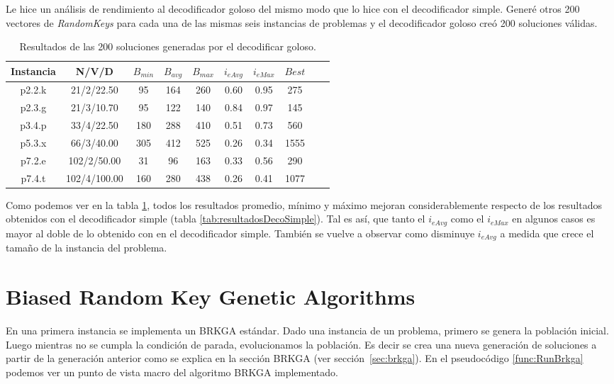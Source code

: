 \bigskip

Le hice un análisis de rendimiento al decodificador goloso del mismo modo que lo hice con el decodificador simple. Generé otros 200 vectores de \textit{RandomKeys} para cada una de las mismas seis instancias de problemas y el decodificador goloso creó 200 soluciones válidas.

\begin{table}
\begin{center}
\begin{tabular}{ |c|c|c|c|c|c|c|c|c|c| } 
\hline
Instancia & N/V/D & $B_{min}$ & $B_{avg}$ & $B_{max}$ & $i_{eAvg}$ & $i_{eMax}$ & $Best$ \\
\hline
p2.2.k & 21/2/22.50 & 95 & 164 & 260 & 0.60 & 0.95 & 275 \\
p2.3.g & 21/3/10.70 & 95 & 122 & 140 & 0.84 & 0.97 & 145 \\
p3.4.p & 33/4/22.50 & 180 & 288 & 410 & 0.51 & 0.73 & 560 \\
p5.3.x & 66/3/40.00 & 305 & 412 & 525 & 0.26 & 0.34 & 1555 \\
p7.2.e & 102/2/50.00 & 31 & 96 & 163 & 0.33 & 0.56 & 290 \\
p7.4.t & 102/4/100.00 & 160 & 280 & 438 & 0.26 & 0.41 & 1077 \\
\hline
\end{tabular}
\end{center}
\caption{Resultados de las 200 soluciones generadas por el decodificar goloso.}
\label{tab:resultadosDecoGoloso}
\end{table}

\bigskip

Como podemos ver en la tabla \ref{tab:resultadosDecoGoloso}, todos los resultados promedio, mínimo y máximo mejoran considerablemente respecto de los resultados obtenidos con el decodificador simple (tabla \ref{tab:resultadosDecoSimple}). Tal es así, que tanto el $i_{eAvg}$ como el $i_{eMax}$ en algunos casos es mayor al doble de lo obtenido con en el decodificador simple. También se vuelve a observar como disminuye $i_{eAvg}$ a medida que crece el tamaño de la instancia del problema.

\section{Biased Random Key Genetic Algorithms}

En una primera instancia se implementa un BRKGA estándar. Dado una instancia de un problema, primero se genera la población inicial. Luego mientras no se cumpla la condición de parada, evolucionamos la población. Es decir se crea una nueva generación de soluciones a partir de la generación anterior como se explica en la sección BRKGA (ver sección~\ref{sec:brkga}). En el pseudocódigo \ref{func:RunBrkga} podemos ver un punto de vista macro del algoritmo BRKGA implementado.

